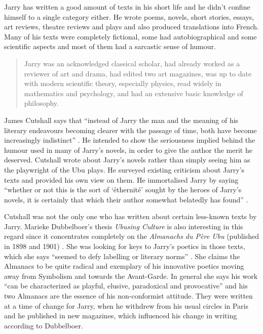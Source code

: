 Jarry has written a good amount of texts in his short life and he didn't confine himself to a single category either. He wrote poems, novels, short stories, essays, art reviews, theatre reviews and plays and also produced translations into French. Many of his texts were completely fictional, some had autobiographical and some scientific aspects and most of them had a sarcastic sense of humour.

\begin{quotation}
  Jarry was an acknowledged classical scholar, had already worked as a reviewer of art and drama, had edited two art magazines, was up to date with modern scientific theory, especially physics, read widely in mathematics and psychology, and had an extensive basic knowledge of philosophy. 
\end{quotation}

James Cutshall says that ``instead of Jarry the man and the meaning of his literary endeavours becoming clearer with the passage of time, both have become increasingly indistinct'' \citeyear[p.246]{Cutshall1988}. He intended to show the seriousness implied behind the humour used in many of Jarry's novels, in order to give the author the merit he deserved. Cutshall wrote about Jarry's novels rather than simply seeing him as the playwright of the Ubu plays. He surveyed existing criticism about Jarry's texts and provided his own view on them. He immortalised Jarry by saying ``whether or not this is the sort of `éthernité' sought by the heroes of Jarry's novels, it is certainly that which their author somewhat belatedly has found'' \autocite[p.248]{Cutshall1988}.


Cutshall was not the only one who has written about certain less-known texts by Jarry. Marieke Dubbelboer's thesis \textit{Ubusing Culture} is also interesting in this regard since it concentrates completely on the \textit{Almanachs du Père Ubu} (published in 1898 and 1901) \autocite*{Dubbelboer2009}. She was looking for keys to Jarry's poetics in those texts, which she says ``seemed to defy labelling or literary norms'' \autocite[p.10]{Dubbelboer2009}. She claims the Almanacs to be quite radical and exemplary of his innovative poetics moving away from Symbolism and towards the Avant-Garde. In general she says his work ``can be characterized as playful, elusive, paradoxical and provocative'' \autocite[p.197]{Dubbelboer2009} and his two Almanacs are the essence of his non-conformist attitude. They were written at a time of change for Jarry, when he withdrew from his usual circles in Paris and he published in new magazines, which influenced his change in writing according to Dubbelboer.

